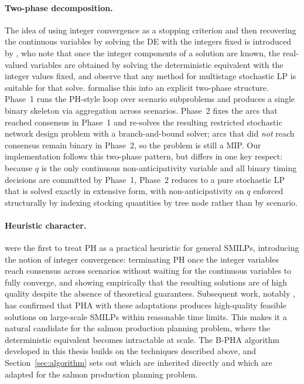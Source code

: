 \documentclass[12pt,a4paper]{article}
\begin{document}
\paragraph{Two-phase decomposition.}
The idea of using integer convergence as a stopping criterion and then recovering
the continuous variables by solving the DE with the integers fixed is introduced by
\citet{lokketangen1996progressive}, who note that once the integer components of
a solution are known, the real-valued variables are obtained by solving the
deterministic equivalent with the integer values fixed, and observe that any method
for multistage stochastic LP is suitable for that solve.
\citet{crainic2009progressive} formalise this into an explicit two-phase structure.
Phase~1 runs the PH-style loop over scenario subproblems and produces a single
binary skeleton via aggregation across scenarios. Phase~2 fixes the arcs that
reached consensus in Phase~1 and re-solves the resulting restricted stochastic
network design problem with a branch-and-bound solver; arcs that did \emph{not}
reach consensus remain binary in Phase~2, so the problem is still a MIP.
Our implementation follows this two-phase pattern, but differs in one key respect:
because $q$ is the only continuous non-anticipativity variable and all binary
timing decisions are committed by Phase~1, Phase~2 reduces to a pure stochastic
LP that is solved exactly in extensive form, with non-anticipativity on $q$
enforced structurally by indexing stocking quantities by tree node rather than
by scenario.

\paragraph{Heuristic character.}
\citet{lokketangen1996progressive} were the first to treat PH as a
practical heuristic for general SMILPs, introducing the notion of 
integer convergence: terminating PH once the integer
variables reach consensus across scenarios without waiting for the
continuous variables to fully converge, and showing empirically that
the resulting solutions are of high quality despite the absence of
theoretical guarantees. Subsequent work, notably
\citet{watson2011progressive}, has confirmed that PHA with these
adaptations produces high-quality feasible solutions on large-scale
SMILPs within reasonable time limits.
This makes it a natural candidate for the salmon production planning
problem, where the deterministic equivalent becomes intractable at
scale. The B-PHA algorithm developed in this thesis builds on the
techniques described above, and Section~\ref{sec:algorithm} sets out which
are inherited directly and which are adapted for the salmon production planning problem.
\end{document}
